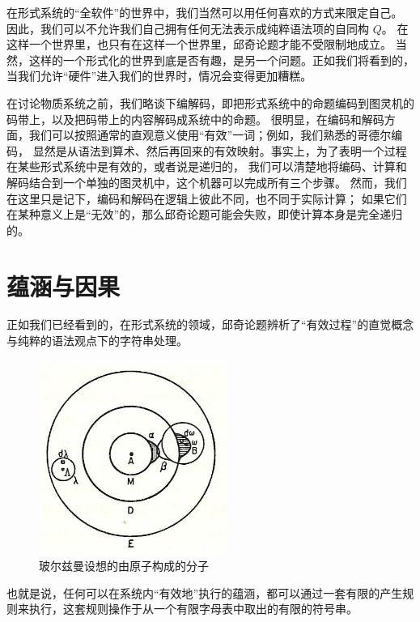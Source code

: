 \documentclass[a4paper,12pt]{article}
\begin{document}
在\gls{形式系统}的“全\gls{软件}”的世界中，我们当然可以用任何喜欢的方式来限定自己。
因此，我们可以不允许我们自己拥有任何无法表示成纯粹\gls{语法项}的自同构 $Q$。
在这样一个世界里，也只有在这样一个世界里，\gls{邱奇论题}才能不受限制地成立。
当然，这样的一个\gls{形式化}的世界到底是否有趣，是另一个问题。正如我们将看到的，当我们允许“\gls{硬件}”进入我们的世界时，情况会变得更加糟糕。

在讨论\gls{物质系统}之前，我们略谈下编解码，即把\gls{形式系统}中的命题\gls{编码}到\gls{图灵机}的码带上，以及把码带上的内容\gls{解码}成系统中的命题。
很明显，在\gls{编码}和\gls{解码}方面，我们可以按照通常的直观意义使用“有效”一词；例如，我们熟悉的\gls{哥德尔编码}，
显然是从\gls{语法}到算术、然后再回来的有效映射。事实上，为了表明一个过程在某些\gls{形式系统}中是有效的，或者说是递归的，
我们可以清楚地将\gls{编码}、计算和\gls{解码}结合到一个单独的\gls{图灵机}中，这个机器可以完成所有三个步骤。
然而，我们在这里只是记下，\gls{编码}和\gls{解码}在\gls{逻辑}上彼此不同，也不同于实际计算；
如果它们在某种意义上是“无效”的，那么\gls{邱奇论题}可能会失败，即使计算本身是完全递归的。

\section{蕴涵与因果}

正如我们已经看到的，在\gls{形式系统}的领域，\gls{邱奇论题}辨析了“\gls{有效过程}”的直觉概念与纯粹的\gls{语法}观点下的\gls{字符串处理}。

\begin{figure}[ht]
\centering
\includegraphics[height=2.5in]{images/boltzmanns_molecule.jpg}
\caption{玻尔兹曼设想的由原子构成的分子}
\end{figure}

也就是说，任何可以在系统内“有效地”执行的\gls{蕴涵}，都可以通过一套有限的产生规则来执行，这套规则操作于从一个有限字母表中取出的有限的符号串。
\end{document}
